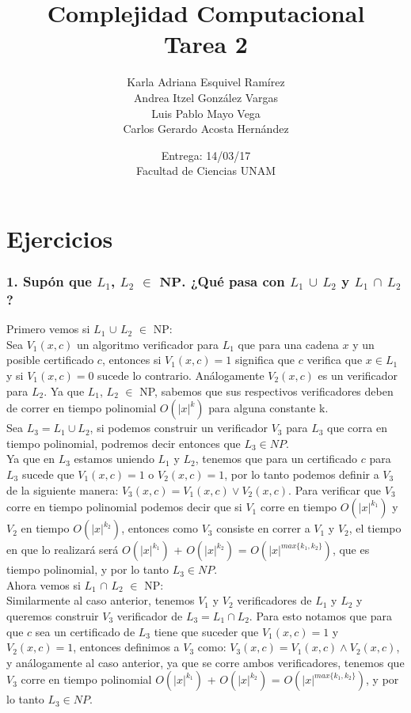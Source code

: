 \documentclass[12pt]{article}
\title{Complejidad Computacional \\ Tarea 2}
\author{Karla Adriana Esquivel Ramírez \\ Andrea Itzel González Vargas\\ Luis Pablo Mayo Vega \\ Carlos Gerardo Acosta Hernández}
\date{Entrega: 14/03/17 \\ Facultad de Ciencias UNAM}
\begin{document}
\maketitle
\section*{Ejercicios}

\subsubsection*{1. Supón que $L_1$, $L_2$ $\in$ $\textbf{NP}$. ¿Qué pasa con $L_1$ $\cup$ $L_2$ y  $L_1$ $\cap$ $L_2$?}

Primero vemos si $L_1$ $\cup$ $L_2$ $\in$ NP: \\
Sea $V_1(x,c)$ un algoritmo verificador para $L_1$ que para una cadena $x$ y un posible certificado $c$, entonces si $V_1(x,c) = 1$ significa que $c$ verifica que $x \in L_1$ y si $V_1(x,c) = 0$ sucede lo contrario. Análogamente $V_2(x,c)$ es un verificador para $L_2$. Ya que $L_1$, $L_2$ $\in$ NP, sabemos que sus respectivos verificadores deben de correr en tiempo polinomial $O(|x|^k)$ para alguna constante k. \\
Sea $L_3 = L_1 \cup L_2$, si podemos construir un verificador $V_3$ para $L_3$ que corra en tiempo polinomial, podremos decir entonces que $L_3 \in NP$. \\
Ya que en $L_3$ estamos uniendo $L_1$ y $L_2$, tenemos que para un certificado $c$ para $L_3$ sucede que $V_1(x,c) = 1$ o $V_2(x,c) = 1$, por lo tanto podemos definir a $V_3$ de la siguiente manera: $V_3(x,c) = V_1(x,c) \lor V_2(x,c)$. Para verificar que $V_3$ corre en tiempo polinomial podemos decir que si $V_1$ corre en tiempo $O(|x|^{k_1})$ y $V_2$ en tiempo $O(|x|^{k_2})$, entonces como $V_3$ consiste en correr a $V_1$ y $V_2$, el tiempo en que lo realizará será $O(|x|^{k_1})$ + $O(|x|^{k_2})$ = $O(|x|^{max\{k_1,k_2\}})$, que es tiempo polinomial, y por lo tanto $L_3 \in NP$. \\

Ahora vemos si $L_1$ $\cap$ $L_2$ $\in$ NP: \\
Similarmente al caso anterior, tenemos $V_1$ y $V_2$ verificadores de $L_1$ y $L_2$ y queremos construir $V_3$ verificador de $L_3 = L_1 \cap L_2$. Para esto notamos que para que $c$ sea un certificado de $L_3$ tiene que suceder que $V_1(x,c) = 1$ y $V_2(x,c) = 1$, entonces definimos a $V_3$ como: $V_3(x,c) = V_1(x,c) \land V_2(x,c)$, y análogamente al caso anterior, ya que se corre ambos verificadores, tenemos que $V_3$ corre en tiempo polinomial $O(|x|^{k_1})$ + $O(|x|^{k_2})$ = $O(|x|^{max\{k_1,k_2\}})$, y por lo tanto $L_3 \in NP$.
\end{document}
